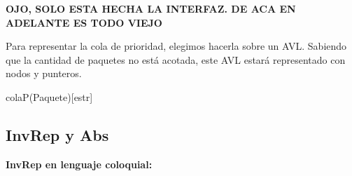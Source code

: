 \begin{Representacion}

\textbf{OJO, SOLO ESTA HECHA LA INTERFAZ. DE ACA EN ADELANTE ES TODO VIEJO}

Para representar la cola de prioridad, elegimos hacerla sobre un AVL. Sabiendo que la cantidad de paquetes no está acotada, este AVL estará representado con nodos y punteros.

\begin{Estructura}{colaP(Paquete)}[estr]
	\begin{Tupla}[estr]
	\end{Tupla}
	
	\begin{Tupla}[nodo]
	\end{Tupla}
	
\end{Estructura}

\subsection{InvRep y Abs}


\textbf{InvRep en lenguaje coloquial:}


\end{Representacion}
